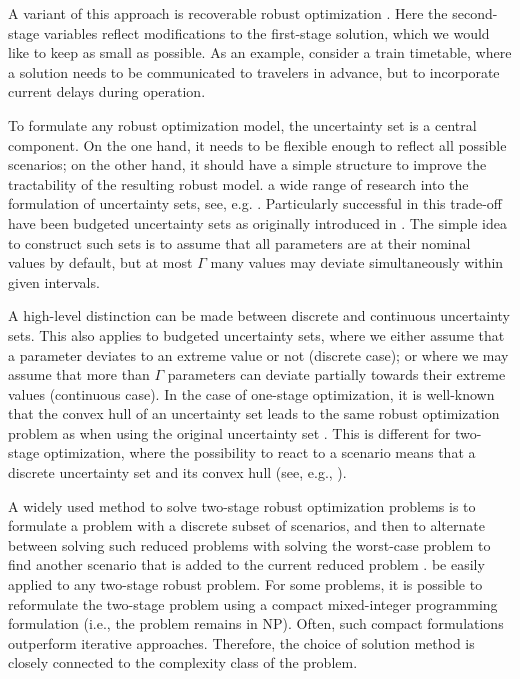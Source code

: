 \documentclass[a4paper,abstracton]{scrartcl}
\begin{document}
A variant of this approach is recoverable robust optimization \cite{liebchen2009concept}. Here the second-stage variables reflect modifications to the first-stage solution, which we would like to keep as small as possible. As an example, consider a train timetable, where a solution needs to be communicated to travelers in advance, but  to incorporate current delays during operation.

To formulate any robust optimization model, the uncertainty set is a central component. On the one hand, it needs to be flexible enough to reflect all possible scenarios; on the other hand, it should have a simple structure to improve the tractability of the resulting robust model.  a wide range of research into the formulation of uncertainty sets, see, e.g. \cite{bertsimas2009constructing}. Particularly successful in this trade-off have been budgeted uncertainty sets as originally introduced in \cite{bertsimas2003robust,bertsimas2004price}. The simple idea to construct such sets is to assume that all parameters are at their nominal values by default, but at most $\Gamma$ many values may deviate simultaneously within given intervals.

A high-level distinction can be made between discrete and continuous uncertainty sets. This also applies to budgeted uncertainty sets, where we either assume that a parameter deviates to an extreme value or not (discrete case); or where we may assume that more than $\Gamma$ parameters can deviate partially towards their extreme values (continuous case). In the case of one-stage optimization, it is well-known that the convex hull of an uncertainty set leads to the same robust optimization problem as when using the original uncertainty set \cite{yanikouglu2019survey}. This is different for two-stage optimization, where the possibility to react to a scenario means that  a discrete uncertainty set and its convex hull (see, e.g., \cite{chassein2018recoverable}).

A widely used method to solve two-stage robust optimization problems is to formulate a problem with a discrete subset of scenarios, and then to alternate between solving such reduced problems with solving the worst-case problem to find another scenario that is added to the current reduced problem \cite{aissi2009min,zeng2013solving}. 
 be easily applied to any two-stage robust problem. For some problems, it is possible to reformulate the two-stage problem using a compact mixed-integer programming formulation (i.e., the problem remains in NP). Often, such compact formulations outperform iterative approaches. Therefore, the choice of solution method is closely connected to the complexity class of the problem.
\end{document}
